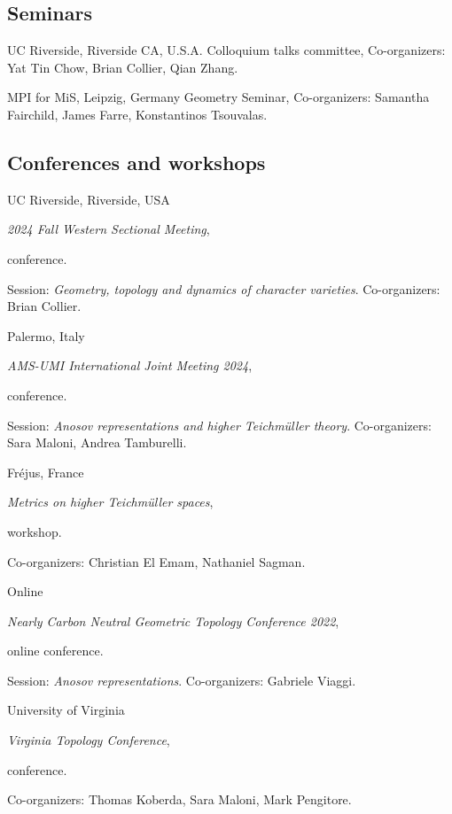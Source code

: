 
\subsection{Seminars}

{UC Riverside, Riverside CA, U.S.A.}
{Colloquium talks committee,}
{Co-organizers: Yat Tin Chow, Brian Collier, Qian Zhang.}

{MPI for MiS, Leipzig, Germany}
{Geometry Seminar,}
{Co-organizers: Samantha Fairchild, James Farre, Konstantinos Tsouvalas.}

\subsection{Conferences and workshops}

{UC Riverside, Riverside, USA}
{\emph{2024 Fall Western Sectional Meeting}, \begin{footnotesize}
		conference.
\end{footnotesize}}
{Session: \emph{Geometry, topology and dynamics of character varieties}. Co-organizers: Brian Collier.}

{Palermo, Italy}
{\emph{ AMS-UMI International Joint Meeting 2024}, \begin{footnotesize}
		conference.
\end{footnotesize}}
{Session: \emph{Anosov representations and higher Teichm\"uller theory}. Co-organizers: Sara Maloni, Andrea Tamburelli.}

{Fr\'ejus, France}
{\emph{Metrics on higher Teichm\"uller spaces}, \begin{footnotesize}
		workshop.
\end{footnotesize}}
{Co-organizers: Christian El Emam, Nathaniel Sagman.}

{Online}
{\emph{Nearly Carbon Neutral Geometric Topology Conference 2022}, \begin{footnotesize}
		online conference.
\end{footnotesize}}
{Session: \emph{Anosov representations}. Co-organizers: Gabriele Viaggi.}

{University of Virginia}
{\emph{Virginia Topology Conference}, \begin{footnotesize}
		conference.
\end{footnotesize}}
{Co-organizers: Thomas Koberda, Sara Maloni, Mark Pengitore.}
%